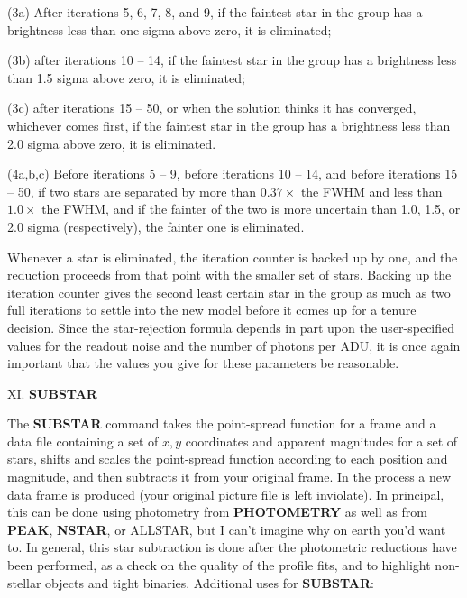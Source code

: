 \item{(3a)} After iterations 5, 6, 7, 8, and 9, if the faintest star in
the group has a brightness less than one sigma above zero, it is
eliminated;

\item{(3b)} after iterations 10 -- 14, if the faintest star in the
group has a brightness less than 1.5 sigma above zero, it is
eliminated;

\item{(3c)} after iterations 15 -- 50, or when the solution thinks it
has converged, whichever comes first, if the faintest star in the group
has a brightness less than 2.0 sigma above zero, it is eliminated.

\item{(4a,b,c)}  Before iterations 5 -- 9, before iterations 10 -- 14,
and before iterations 15 -- 50, if two stars are separated by more than
$0.37 \times$  the FWHM and less than $1.0 \times$  the FWHM, and if
the fainter of the two is more uncertain than 1.0, 1.5, or 2.0 sigma
(respectively), the fainter one is eliminated.

\noindent Whenever a star is eliminated, the iteration counter is
backed up by one, and the reduction proceeds from that point with the
smaller set of stars. Backing up the iteration counter gives the second
least certain star in the group as much as two full iterations to
settle into the new model before it comes up for a tenure decision.
Since the star-rejection formula depends in part upon the
user-specified values for the readout noise and the number of photons
per ADU, it is once again important that the values you give for these
parameters be reasonable.

\vfill
\eject
\noindent XI.  {\bf SUBSTAR}

The {\bf SUBSTAR} command takes the point-spread function for a frame
and a data file containing a set of $x,y$ coordinates and apparent
magnitudes for a set of stars, shifts and scales the point-spread
function according to each position and magnitude, and then subtracts
it from your original frame.  In the process a new data frame is
produced (your original picture file is left inviolate). In principal,
this can be done using photometry from {\bf PHOTOMETRY} as well as from
{\bf PEAK}, {\bf NSTAR}, or ALLSTAR, but I can't imagine why on
earth you'd want to.  In general, this star subtraction is done after
the photometric reductions have been performed, as a check on the
quality of the profile fits, and to highlight non-stellar objects and
tight binaries.  Additional uses for {\bf SUBSTAR}:

